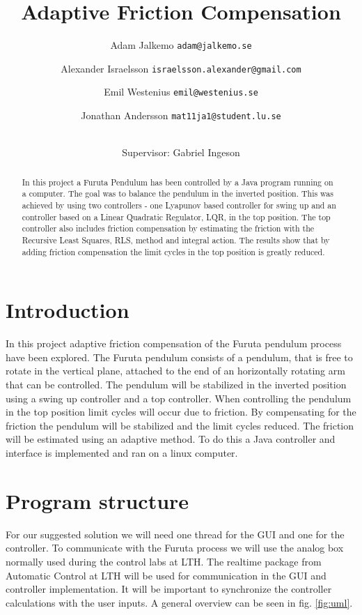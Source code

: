 \documentclass[10pt,a4paper]{article}
\author{Adam Jalkemo \texttt{adam@jalkemo.se} \and
Alexander Israelsson \texttt{israelsson.alexander@gmail.com} \and
Emil Westenius \texttt{emil@westenius.se} \and
Jonathan Andersson \texttt{mat11ja1@student.lu.se}
\and 
\\
Supervisor: Gabriel Ingeson}
\begin{document}
\title{Adaptive Friction Compensation}

\maketitle
\pagebreak
\begin{abstract}
In this project a Furuta Pendulum has been controlled by a Java program running on a computer. The goal was to balance the pendulum in the inverted position. This was achieved by using two controllers - one Lyapunov based controller for swing up and an controller based on a Linear Quadratic Regulator, LQR, in the top position. The top controller also includes friction compensation by estimating the friction with the Recursive Least Squares, RLS, method and integral action. The results show that by adding friction compensation the limit cycles in the top position is greatly reduced.
\end{abstract}
\pagebreak
\section{Introduction}
In this project adaptive friction compensation of the Furuta pendulum process have been explored. The Furuta pendulum consists of a pendulum, that is free to rotate in the vertical plane, attached to the end of an horizontally rotating arm that can be controlled. The pendulum will be stabilized in the inverted position using a swing up controller and a top controller. When controlling the pendulum in the top position limit cycles will occur due to friction. By compensating for the friction the pendulum will be stabilized and the limit cycles reduced. The friction will be estimated using an adaptive method. To do this a Java controller and interface is implemented and ran on a linux computer.
\section{Program structure}
For our suggested solution we will need one thread for the GUI and one for the controller. To communicate with the Furuta process we will use the analog box normally used during the control labs at LTH. The realtime package from Automatic Control at LTH will be used for communication in the GUI and controller implementation. It will be important to synchronize the controller calculations with the user inputs. A general overview can be seen in fig. \ref{fig:uml}.
\end{document}
